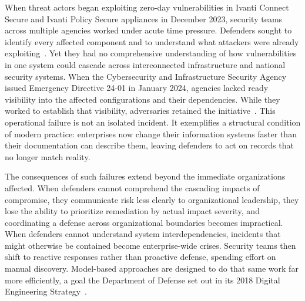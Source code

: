 \label{chap:Chapter_1}



When threat actors began exploiting zero-day vulnerabilities in Ivanti Connect Secure and Ivanti Policy Secure appliances in December 2023, security teams across multiple agencies worked under acute time pressure. Defenders sought to identify every affected component and to understand what attackers were already exploiting~\parencite{Ivanti_Threat_Impact}. Yet they had no comprehensive understanding of how vulnerabilities in one system could cascade across interconnected infrastructure and national security systems. When the Cybersecurity and Infrastructure Security Agency issued Emergency Directive 24-01 in January 2024, agencies lacked ready visibility into the affected configurations and their dependencies. While they worked to establish that visibility, adversaries retained the initiative~\parencite{CISA_Emergency_2023}.
This operational failure is not an isolated incident. It exemplifies a structural condition of modern practice: enterprises now change their information systems faster than their documentation can describe them, leaving defenders to act on records that no longer match reality.

The consequences of such failures extend beyond the immediate organizations affected. When defenders cannot comprehend the cascading impacts of compromise, they communicate risk less clearly to organizational leadership, they lose the ability to prioritize remediation by actual impact severity, and coordinating a defense across organizational boundaries becomes impractical. When defenders cannot understand system interdependencies, incidents that might otherwise be contained become enterprise-wide crises. Security teams then shift to reactive responses rather than proactive defense, spending effort on manual discovery. Model-based approaches are designed to do that same work far more efficiently, a goal the Department of Defense set out in its 2018 Digital Engineering Strategy~\parencite{DoD_DE_Strategy_2018}.

